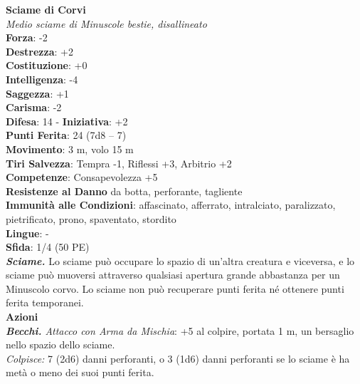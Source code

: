 \begin{multicols}{2}
\medskip\textbf{Sciame di Corvi}\\
\emph{Medio sciame di Minuscole bestie, disallineato}\\
\textbf{Forza}: -2\\
\textbf{Destrezza}: +2\\
\textbf{Costituzione}: +0\\
\textbf{Intelligenza}: -4\\
\textbf{Saggezza}: +1\\
\textbf{Carisma}: -2\\
\textbf{Difesa}: 14 - \textbf{Iniziativa}: +2\\
\textbf{Punti Ferita}: 24 (7d8 -- 7)\\
\textbf{Movimento}: 3 m, volo 15 m\\
\textbf{Tiri Salvezza}: Tempra -1, Riflessi +3, Arbitrio +2\\
\textbf{Competenze}: Consapevolezza +5\\
\textbf{Resistenze al Danno} da botta, perforante, tagliente \\
\textbf{Immunità alle Condizioni}: affascinato, afferrato, intralciato, paralizzato, pietrificato, prono, spaventato, stordito\\
\textbf{Lingue}: -\\
\textbf{Sfida}: 1/4 (50 PE)\smallskip\\
\emph{\textbf{Sciame.}} Lo sciame può occupare lo spazio di un'altra creatura e viceversa, e lo sciame può muoversi attraverso qualsiasi apertura grande abbastanza per un Minuscolo corvo. Lo sciame non può recuperare punti ferita né ottenere punti ferita temporanei.\\
\smallskip\textbf{Azioni}\\
\emph{\textbf{Becchi.} Attacco con Arma da Mischia}: +5 al colpire, portata 1 m, un bersaglio nello spazio dello sciame.\\
\emph{Colpisce:} 7 (2d6) danni perforanti, o 3 (1d6) danni perforanti se lo sciame è ha metà o meno dei suoi punti ferita.\\


\end{multicols}
